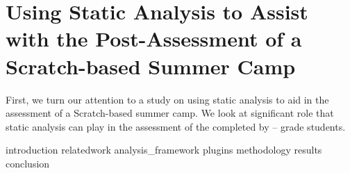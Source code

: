 \chapter{Using Static Analysis to Assist with the Post-Assessment of a
               Scratch-based Summer Camp}
\label{chap:hairball}

\def\currentprefix{hairball}

First, we turn our attention to a study on using static analysis to aid in the
assessment of a Scratch-based summer camp. We look at significant role that
static analysis can play in the assessment of the  completed by
-- grade students.

{introduction}
{relatedwork}
{analysis_framework}
{plugins}
{methodology}
{results}
{conclusion}
